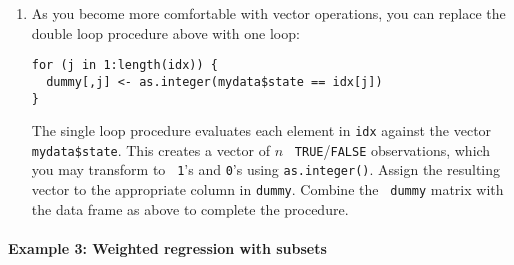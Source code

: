 \begin{enumerate}
\begin{enumerate}
\item As you become more comfortable with vector operations, you can
replace the double loop procedure above with one loop:   
\begin{verbatim}
for (j in 1:length(idx)) { 
  dummy[,j] <- as.integer(mydata$state == idx[j])
}
\end{verbatim} %
The single loop procedure evaluates each element in {\tt idx} against the vector {\tt mydata\$state}.  This creates a vector of $n$ {\tt
    TRUE}/{\tt FALSE} observations, which you may transform to {\tt
    1}'s and {\tt 0}'s using {\tt as.integer()}.  Assign the resulting
  vector to the appropriate column in {\tt dummy}.  Combine the {\tt
dummy} matrix with the data frame as above to complete the procedure.
\end{enumerate}
\end{enumerate}

\paragraph{Example 3: Weighted regression with subsets}  

